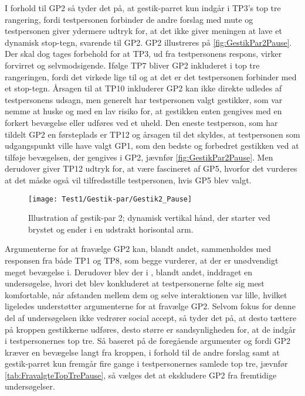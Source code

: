 \noindent
% 
I forhold til GP2 så tyder det på, at gestik-parret kun indgår i TP3's top tre rangering, fordi testpersonen forbinder de andre forslag med mute og testpersonen giver ydermere udtryk for, at det ikke giver meningen at lave et dynamisk stop-tegn, svarende til GP2. GP2 illustreres på \autoref{fig:GestikPar2Pause}. Der skal dog tages forbehold for at TP3, ud fra testpersonens respons, virker forvirret og selvmodsigende. Ifølge TP7 bliver GP2 inkluderet i top tre rangeringen, fordi det virkede lige til og at det er det testpersonen forbinder med et stop-tegn. Årsagen til at TP10 inkluderer GP2 kan ikke direkte udledes af testpersonens udsagn, men generelt har testpersonen valgt gestikker, som var nemme at huske og med en lav risiko for, at gestikken enten gengives med en forkert bevægelse eller udføres ved et uheld. Den eneste testperson, som har tildelt GP2 en førsteplads er TP12 og årsagen til det skyldes, at testpersonen som udgangspunkt ville have valgt GP1, som den bedste og forbedret gestikken ved at tilføje bevægelsen, der gengives i GP2, jævnfør \autoref{fig:GestikPar2Pause}. Men derudover giver TP12 udtryk for, at være fascineret af GP5, hvorfor det vurderes at det måske også vil tilfredsstille testpersonen, hvis GP5 blev valgt. 
%
\begin{figure}[H]
	\centering
	\texttt{[image: Test1/Gestik-par/Gestik2\_Pause]}
	\caption{Illustration af gestik-par 2; dynamisk vertikal hånd, der starter ved brystet og ender i en udstrakt horisontal arm.}
	\label{fig:GestikPar2Pause}
\end{figure}
\noindent
% 
Argumenterne for at fravælge GP2 kan, blandt andet, sammenholdes med responsen fra både TP1 og TP8, som begge vurderer, at der er unødvendigt meget bevægelse i. Derudover blev der i , blandt andet, inddraget en undersøgelse, hvori det blev konkluderet at testpersonerne følte sig mest komfortable, når afstanden mellem dem og selve interaktionen var lille, hvilket ligeledes understøtter argumenterne for at fravælge GP2. Selvom fokus for denne del af undersøgelsen ikke vedrører social accept, så tyder det på, at desto tættere på kroppen gestikkerne udføres, desto større er sandsynligheden for, at de indgår i testpersonernes top tre. Så baseret på de foregående argumenter og fordi GP2 kræver en bevægelse langt fra kroppen, i forhold til de andre forslag samt at gestik-parret kun fremgår fire gange i testpersonernes samlede top tre, jævnfør \autoref{tab:FravalgteTopTrePause}, så vælges det at ekskludere GP2 fra fremtidige undersøgelser. 
%
